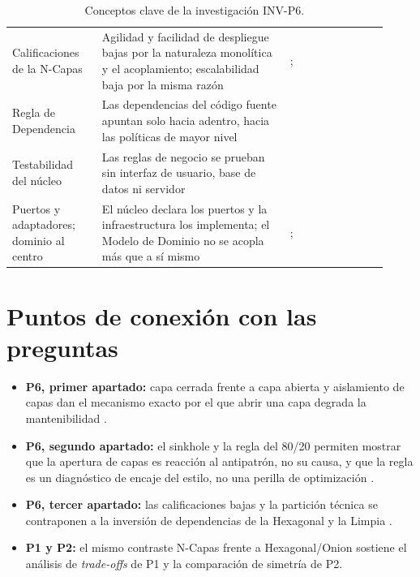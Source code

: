 \begin{table}[htbp]
\begin{tabular}{@{}p{0.22\linewidth}p{0.46\linewidth}p{0.24\linewidth}@{}}
    \raggedright Calificaciones de la N-Capas
      & \raggedright Agilidad y facilidad de despliegue bajas por la naturaleza monolítica y el
        acoplamiento; escalabilidad baja por la misma razón
      & \raggedright \textcite[8-9]{richards2015}; \textcite[cap.~10]{richardsford2020}
        \tabularnewline
    \raggedright Regla de Dependencia
      & \raggedright Las dependencias del código fuente apuntan solo hacia adentro, hacia las
        políticas de mayor nivel
      & \raggedright \textcite[203]{martin2017} \tabularnewline
    \raggedright Testabilidad del núcleo
      & \raggedright Las reglas de negocio se prueban sin interfaz de usuario, base de datos ni
        servidor
      & \raggedright \textcite[202]{martin2017} \tabularnewline
    \raggedright Puertos y adaptadores; dominio al centro
      & \raggedright El núcleo declara los puertos y la infraestructura los implementa; el
        Modelo de Dominio no se acopla más que a sí mismo
      & \raggedright \textcite{cockburn2005}; \textcite{palermo2008} \tabularnewline
    \bottomrule
  \end{tabular}
  \caption{Conceptos clave de la investigación INV-P6.}
  \label{tab:inv-p6-conceptos}
\end{table}

\section{Puntos de conexión con las preguntas}

\begin{itemize}
  \item \textbf{P6, primer apartado:} capa cerrada frente a capa abierta y aislamiento de capas
        dan el mecanismo exacto por el que abrir una capa degrada la mantenibilidad
        \parencite[3-5]{richards2015}.
  \item \textbf{P6, segundo apartado:} el sinkhole y la regla del 80/20 permiten mostrar que la
        apertura de capas es reacción al antipatrón, no su causa, y que la regla es un
        diagnóstico de encaje del estilo, no una perilla de optimización
        \parencite[7]{richards2015}.
  \item \textbf{P6, tercer apartado:} las calificaciones bajas \parencite[8-9]{richards2015} y
        la partición técnica \parencite[cap.~10]{richardsford2020} se contraponen a la inversión
        de dependencias de la Hexagonal y la Limpia \parencite[203]{martin2017}.
  \item \textbf{P1 y P2:} el mismo contraste N-Capas frente a Hexagonal/Onion sostiene el
        análisis de \emph{trade-offs} de P1 y la comparación de simetría de P2.
\end{itemize}


